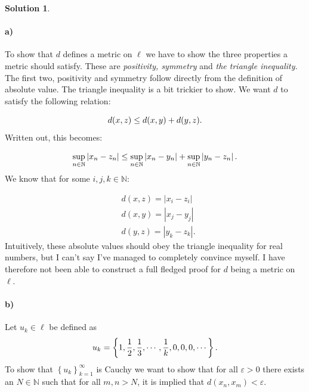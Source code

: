 \documentclass[a4paper]{article}
\theoremstyle{definition}
\newtheorem{sol}{Solution}
\begin{document}
\begin{sol}
\item\paragraph{a)} %

To show that $d$ defines a metric on $\ell$ we have to show the three
properties a metric should satisfy. These are \textit{positivity, symmetry} and
\textit{the triangle inequality.} The first two, positivity and symmetry follow
directly from the definition of absolute value.  The triangle inequality is a
bit trickier to show. We want $d$ to satisfy the following relation:

\begin{equation}
  \notag
  d(x, z) \leq d(x, y) + d(y, z).
\end{equation}
Written out, this becomes:

\begin{equation}
  \notag
  \sup\limits_{n\in\mathbb{N}} \left| x_n - z_n\right| \leq \sup\limits_{n\in\mathbb{N}} \left| x_n - y_n\right| +  \sup\limits_{n\in\mathbb{N}} \left| y_n - z_n\right|.
\end{equation}
We know that for some $i, j, k \in \mathbb{N}$:

\begin{align*}
  &d(x, z) = \left| x_i - z_i \right| \\
  &d(x, y) = \left| x_j - y_j \right| \\
  &d(y, z) = \left| y_k - z_k \right|.
\end{align*}
Intuitively, these absolute values should obey the triangle inequality for real
numbers, but I can't say I've managed to completely convince myself. I have
therefore not been able to construct a full fledged proof for $d$ being a
metric on $\ell$.

\paragraph{b)}
Let $u_k \in \ell$ be defined as
\begin{equation}
  \notag
  u_k = \left\{ 1, \frac{1}{2}, \frac{1}{3}, \cdots, \frac{1}{k}, 0, 0, 0, \cdots \right\}.
\end{equation}
To show that $\left\{ u_k \right\}_{ k = 1 }^{\infty}$ is Cauchy we want to
show that for all $\varepsilon > 0$ there exists an $N \in \mathbb{N}$ such
that for all $m, n > N$, it is implied that $d\left( x_n, x_m \right) <
\varepsilon$.


\end{sol}
\end{document}
